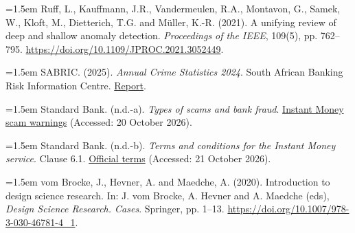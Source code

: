 \documentclass[11pt,a4paper]{article}
\begin{document}
{\small\hangindent=1.5em Ruff, L., Kauffmann, J.R., Vandermeulen, R.A., Montavon, G., Samek, W., Kloft, M., Dietterich, T.G. and M\"uller, K.-R. (2021). A unifying review of deep and shallow anomaly detection. \emph{Proceedings of the IEEE}, 109(5), pp. 762--795. \url{https://doi.org/10.1109/JPROC.2021.3052449}.\par}

{\small\hangindent=1.5em SABRIC. (2025). \emph{Annual Crime Statistics 2024}. South African Banking Risk Information Centre. \href{https://www.sabric.co.za/wp-content/uploads/2025/09/CRIME-STATISTICS-REPORT-2024.pdf}{Report}.\par}

{\small\hangindent=1.5em Standard Bank. (n.d.-a). \emph{Types of scams and bank fraud}. \href{https://www.standardbank.co.za/southafrica/personal/products-and-services/security-centre/bank-safely/scams}{Instant Money scam warnings} (Accessed: 20 October 2026).\par}

{\small\hangindent=1.5em Standard Bank. (n.d.-b). \emph{Terms and conditions for the Instant Money service}. Clause 6.1. \href{https://sbgmobile.standardbank.co.za/SBGMobileApp/termsandconditions/instantmoney}{Official terms} (Accessed: 21 October 2026).\par}

{\small\hangindent=1.5em vom Brocke, J., Hevner, A. and Maedche, A. (2020). Introduction to design science research. In: J. vom Brocke, A. Hevner and A. Maedche (eds), \emph{Design Science Research. Cases}. Springer, pp. 1--13. \url{https://doi.org/10.1007/978-3-030-46781-4_1}.\par}

\end{document}
